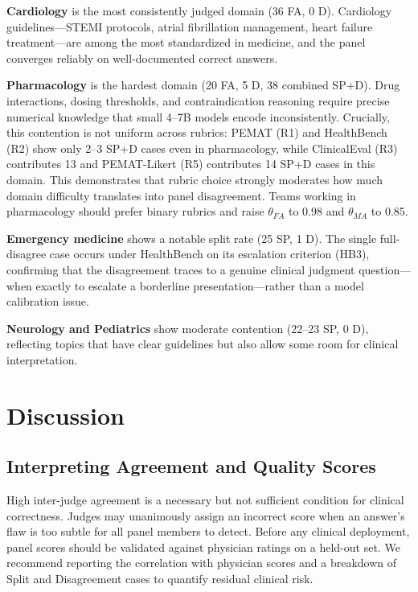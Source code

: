 \documentclass[conference]{IEEEtran}
\begin{document}
\textbf{Cardiology} is the most consistently judged domain (36 FA,
0 D). Cardiology guidelines---STEMI protocols, atrial fibrillation
management, heart failure treatment---are among the most standardized
in medicine, and the panel converges reliably on well-documented
correct answers.

\textbf{Pharmacology} is the hardest domain (20 FA, 5 D, 38 combined
SP+D). Drug interactions, dosing thresholds, and contraindication
reasoning require precise numerical knowledge that small 4--7B models
encode inconsistently. Crucially, this contention is not uniform across
rubrics: PEMAT (R1) and HealthBench (R2) show only 2--3 SP+D cases
even in pharmacology, while ClinicalEval (R3) contributes 13 and
PEMAT-Likert (R5) contributes 14 SP+D cases in this domain. This
demonstrates that rubric choice strongly moderates how much domain
difficulty translates into panel disagreement. Teams working in
pharmacology should prefer binary rubrics and raise $\theta_{FA}$
to 0.98 and $\theta_{MA}$ to 0.85.

\textbf{Emergency medicine} shows a notable split rate (25 SP, 1 D).
The single full-disagree case occurs under HealthBench on its escalation
criterion (HB3), confirming that the disagreement traces to a genuine
clinical judgment question---when exactly to escalate a borderline
presentation---rather than a model calibration issue.

\textbf{Neurology and Pediatrics} show moderate contention (22--23 SP,
0 D), reflecting topics that have clear guidelines but also allow some
room for clinical interpretation.

\section{Discussion}

\subsection{Interpreting Agreement and Quality Scores}

High inter-judge agreement is a necessary but not sufficient condition
for clinical correctness. Judges may unanimously assign an incorrect
score when an answer's flaw is too subtle for all panel members to
detect. Before any clinical deployment, panel scores should be validated
against physician ratings on a held-out set. We recommend reporting the
correlation with physician scores and a breakdown of Split and
Disagreement cases to quantify residual clinical risk.
\end{document}
